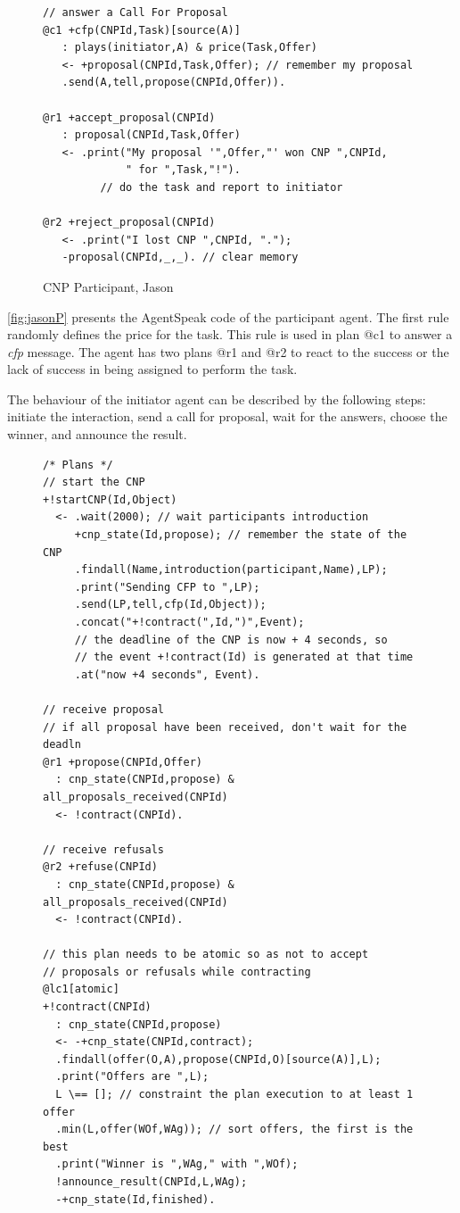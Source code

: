 \documentclass[a4paper,12pt,oneside,fleqn]{book} %
\begin{document}
{\begin{figure}
\begin{verbatim}
// answer a Call For Proposal
@c1 +cfp(CNPId,Task)[source(A)]
   : plays(initiator,A) & price(Task,Offer)
   <- +proposal(CNPId,Task,Offer); // remember my proposal
   .send(A,tell,propose(CNPId,Offer)).

@r1 +accept_proposal(CNPId)
   : proposal(CNPId,Task,Offer)
   <- .print("My proposal '",Offer,"' won CNP ",CNPId,
             " for ",Task,"!").
         // do the task and report to initiator

@r2 +reject_proposal(CNPId)
   <- .print("I lost CNP ",CNPId, ".");
   -proposal(CNPId,_,_). // clear memory

\end{verbatim}
\caption{CNP Participant, Jason}
\label{fig:jasonP}
\end{figure} %

\autoref{fig:jasonP} presents the AgentSpeak code of the participant agent.
The first rule randomly defines the price for the task. This rule is used
in plan @c1 to answer a \textit{cfp} message. The agent has two plans @r1
and @r2 to react to the success or the lack of success in being assigned to
perform the task.


The behaviour of the initiator agent can be described by the following
steps: initiate the interaction, send a call for proposal, wait for the
answers, choose the winner, and announce the result. 

\begin{figure}\footnotesize %
\begin{verbatim}
/* Plans */
// start the CNP
+!startCNP(Id,Object)
  <- .wait(2000); // wait participants introduction
     +cnp_state(Id,propose); // remember the state of the CNP
     .findall(Name,introduction(participant,Name),LP);
     .print("Sending CFP to ",LP);
     .send(LP,tell,cfp(Id,Object));
     .concat("+!contract(",Id,")",Event);
     // the deadline of the CNP is now + 4 seconds, so
     // the event +!contract(Id) is generated at that time
     .at("now +4 seconds", Event).

// receive proposal
// if all proposal have been received, don't wait for the deadln
@r1 +propose(CNPId,Offer)
  : cnp_state(CNPId,propose) & all_proposals_received(CNPId)
  <- !contract(CNPId).

// receive refusals
@r2 +refuse(CNPId)
  : cnp_state(CNPId,propose) & all_proposals_received(CNPId)
  <- !contract(CNPId).

// this plan needs to be atomic so as not to accept
// proposals or refusals while contracting
@lc1[atomic]
+!contract(CNPId)
  : cnp_state(CNPId,propose)
  <- -+cnp_state(CNPId,contract);
  .findall(offer(O,A),propose(CNPId,O)[source(A)],L);
  .print("Offers are ",L);
  L \== []; // constraint the plan execution to at least 1 offer
  .min(L,offer(WOf,WAg)); // sort offers, the first is the best
  .print("Winner is ",WAg," with ",WOf);
  !announce_result(CNPId,L,WAg);
  -+cnp_state(Id,finished).


\end{verbatim}
\end{figure}}
\end{document}
